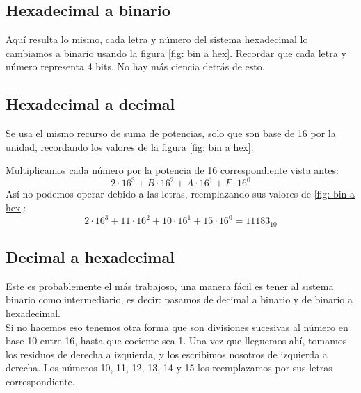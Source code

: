 \documentclass[
	12pt, %
	fleqn, %
	a4paper, %
	oneside, %
]{LegrandOrangeBook}
\begin{document}
\subsection{Hexadecimal a binario}
Aquí resulta lo mismo, cada letra y número del sistema hexadecimal lo cambiamos a binario usando la figura \ref{fig: bin a hex}. Recordar que cada letra y número representa 4 bits. No hay más ciencia detrás de esto.
\subsection{Hexadecimal a decimal}
Se usa el mismo recurso de suma de potencias, solo que son base de 16 por la unidad, recordando los valores de la figura \ref{fig: bin a hex}.
\begin{example}
Multiplicamos cada número por la potencia de 16 correspondiente vista antes:
\begin{displaymath}
2\cdot 16^3 + B\cdot 16^2 + A\cdot 16^1 + F\cdot 16^0
\end{displaymath}
Así no podemos operar debido a las letras, reemplazando sus valores de \ref{fig: bin a hex}:
\begin{displaymath}
2\cdot 16^3 + 11\cdot 16^2 + 10\cdot 16^1 + 15\cdot 16^0=11 183_{10}
\end{displaymath}
\end{example}
\subsection{Decimal a hexadecimal}
Este es probablemente el más trabajoso, una manera fácil es tener al sistema binario como intermediario, es decir: pasamos de decimal a binario y de binario a hexadecimal.\\
Si no hacemos eso tenemos otra forma que son divisiones sucesivas al número en base 10 entre 16, hasta que cociente sea 1. Una vez que lleguemos ahí, tomamos los residuos de derecha a izquierda, y los escribimos nosotros de izquierda a derecha. Los números 10, 11, 12, 13, 14 y 15 los reemplazamos por sus letras correspondiente.
\newcount\total
\newcount\lasttotal
\newcount\targetbase
\end{document}
